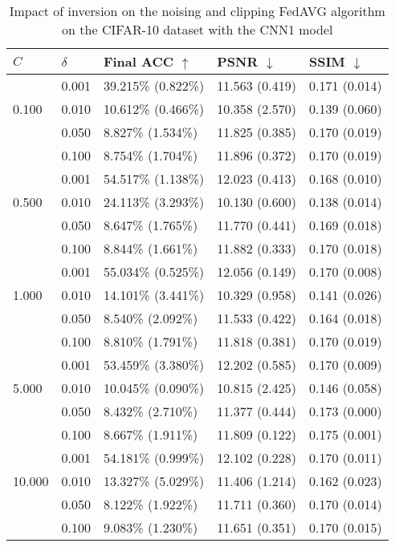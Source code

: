 \documentclass[conference,compsoc]{IEEEtran}
\begin{document}
\begin{table}[H]
\centering
\caption{Impact of inversion on the noising and clipping FedAVG algorithm on the CIFAR-10 dataset with the CNN1 model}
\label{table:dp_cifar10_cnn1}
\begin{tabular}{lllll}
\hline
$C$ & $\delta$ & \textbf{Final ACC} $\uparrow$ & \textbf{PSNR} $\downarrow$ & \textbf{SSIM} $\downarrow$ \\
\hline
\multirow{3}{*}{0.100} & 0.001 & 39.215\% (0.822\%) & 11.563 (0.419) & 0.171 (0.014) \\
& 0.010 & 10.612\% (0.466\%) & 10.358 (2.570) & 0.139 (0.060) \\
& 0.050 & 8.827\% (1.534\%) & 11.825 (0.385) & 0.170 (0.019) \\
& 0.100 & 8.754\% (1.704\%) & 11.896 (0.372) & 0.170 (0.019) \\
\hline
\multirow{3}{*}{0.500} & 0.001 & 54.517\% (1.138\%) & 12.023 (0.413) & 0.168 (0.010) \\
& 0.010 & 24.113\% (3.293\%) & 10.130 (0.600) & 0.138 (0.014) \\
& 0.050 & 8.647\% (1.765\%) & 11.770 (0.441) & 0.169 (0.018) \\
& 0.100 & 8.844\% (1.661\%) & 11.882 (0.333) & 0.170 (0.018) \\
\hline
\multirow{3}{*}{1.000} & 0.001 & 55.034\% (0.525\%) & 12.056 (0.149) & 0.170 (0.008) \\
& 0.010 & 14.101\% (3.441\%) & 10.329 (0.958) & 0.141 (0.026) \\
& 0.050 & 8.540\% (2.092\%) & 11.533 (0.422) & 0.164 (0.018) \\
& 0.100 & 8.810\% (1.791\%) & 11.818 (0.381) & 0.170 (0.019) \\
\hline
\multirow{3}{*}{5.000} & 0.001 & 53.459\% (3.380\%) & 12.202 (0.585) & 0.170 (0.009) \\
& 0.010 & 10.045\% (0.090\%) & 10.815 (2.425) & 0.146 (0.058) \\
& 0.050 & 8.432\% (2.710\%) & 11.377 (0.444) & 0.173 (0.000) \\
& 0.100 & 8.667\% (1.911\%) & 11.809 (0.122) & 0.175 (0.001) \\
\hline
\multirow{3}{*}{10.000} & 0.001 & 54.181\% (0.999\%) & 12.102 (0.228) & 0.170 (0.011) \\
& 0.010 & 13.327\% (5.029\%) & 11.406 (1.214) & 0.162 (0.023) \\
& 0.050 & 8.122\% (1.922\%) & 11.711 (0.360) & 0.170 (0.014) \\
& 0.100 & 9.083\% (1.230\%) & 11.651 (0.351) & 0.170 (0.015) \\
\hline
\end{tabular}
\end{table}
\end{document}

